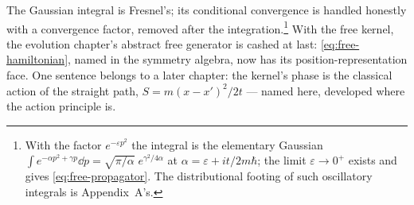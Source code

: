 The Gaussian integral is Fresnel's; its conditional convergence is handled honestly with a convergence factor, removed after the integration.\footnote{With the factor $e^{-\varepsilon p^2}$ the integral is the elementary Gaussian $\int e^{-\alpha p^2 + \gamma p}\dd p = \sqrt{\pi/\alpha}\;e^{\gamma^2/4\alpha}$ at $\alpha = \varepsilon + it/2m\hbar$; the limit $\varepsilon \to 0^{+}$ exists and gives \eqref{eq:free-propagator}. The distributional footing of such oscillatory integrals is Appendix~A's.} With the free kernel, the evolution chapter's abstract free generator is cashed at last: \eqref{eq:free-hamiltonian}, named in the symmetry algebra, now has its position-representation face. One sentence belongs to a later chapter: the kernel's phase is the classical action of the straight path, $S = m(x - x')^2/2t$ --- named here, developed where the action principle is.


